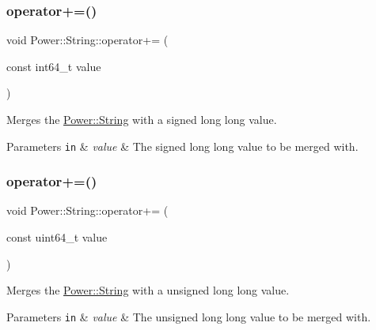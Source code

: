 \subsubsection{\texorpdfstring{operator+=()}{operator+=()}\hspace{0.1cm}{\footnotesize\ttfamily [8/11]}}
{\footnotesize\ttfamily void Power\+::\+String\+::operator+= (\begin{DoxyParamCaption}\item[{const int64\+\_\+t}]{value }\end{DoxyParamCaption})\hspace{0.3cm}{\ttfamily [inline]}}



Merges the \hyperlink{class_power_1_1_string}{Power\+::\+String} with a signed long long value. 


\begin{DoxyParams}[1]{Parameters}
\mbox{\tt in}  & {\em value} & The signed long long value to be merged with. \\
\hline
\end{DoxyParams}
\mbox{\label{class_power_1_1_string_a9ccf03d5cef8d756d82c7b198e65392d}} 
\subsubsection{\texorpdfstring{operator+=()}{operator+=()}\hspace{0.1cm}{\footnotesize\ttfamily [9/11]}}
{\footnotesize\ttfamily void Power\+::\+String\+::operator+= (\begin{DoxyParamCaption}\item[{const uint64\+\_\+t}]{value }\end{DoxyParamCaption})\hspace{0.3cm}{\ttfamily [inline]}}



Merges the \hyperlink{class_power_1_1_string}{Power\+::\+String} with a unsigned long long value. 


\begin{DoxyParams}[1]{Parameters}
\mbox{\tt in}  & {\em value} & The unsigned long long value to be merged with. \\
\hline
\end{DoxyParams}
\mbox{\label{class_power_1_1_string_a9ac2eb1de5bf6a9232e85abbcb4c9bf2}} 
